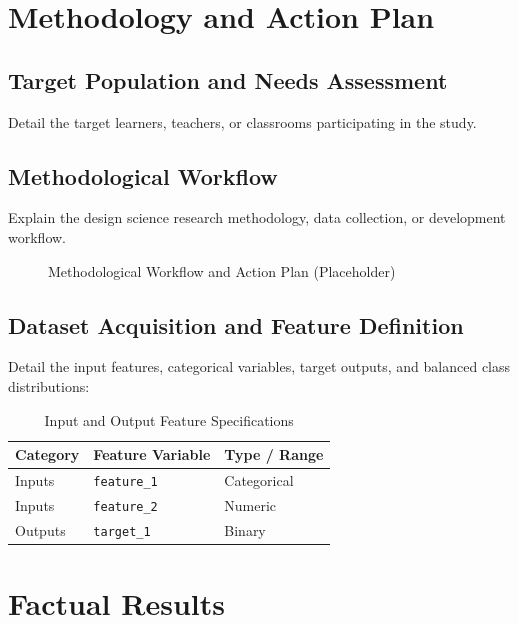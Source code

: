\documentclass[12pt,a4paper]{report}
\begin{document}
\chapter{Methodology and Action Plan}
\section{Target Population and Needs Assessment}
Detail the target learners, teachers, or classrooms participating in the study.

\section{Methodological Workflow}
Explain the design science research methodology, data collection, or development workflow.
\begin{figure}[H]
  \centering
  \caption{Methodological Workflow and Action Plan (Placeholder)}
  \label{fig:workflow}
\end{figure}

\section{Dataset Acquisition and Feature Definition}
Detail the input features, categorical variables, target outputs, and balanced class distributions:
\begin{table}[H]
  \centering
  \small
  \caption{Input and Output Feature Specifications}
  \label{tab:features}
  \begin{tabular}{lll}
    \toprule
    \textbf{Category} & \textbf{Feature Variable} & \textbf{Type / Range} \\
    \midrule
    Inputs & \texttt{feature\_1} & Categorical \\
    Inputs & \texttt{feature\_2} & Numeric \\
    Outputs & \texttt{target\_1} & Binary \\
    \bottomrule
  \end{tabular}
\end{table}

\chapter{Factual Results}
\end{document}
